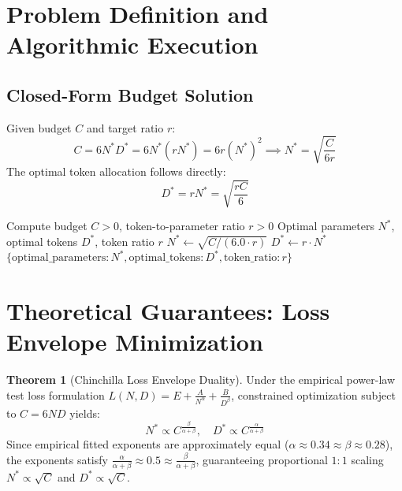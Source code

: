 \documentclass[11pt,a4paper]{article}
\theoremstyle{definition}
\newtheorem{theorem}{Theorem}[section]
\begin{document}
\section{Problem Definition and Algorithmic Execution}

\subsection{Closed-Form Budget Solution}
Given budget $C$ and target ratio $r$:
\begin{equation}
C = 6 N^* D^* = 6 N^* (r N^*) = 6 r (N^*)^2 \implies N^* = \sqrt{\frac{C}{6 r}}
\end{equation}
The optimal token allocation follows directly:
\begin{equation}
D^* = r N^* = \sqrt{\frac{r C}{6}}
\end{equation}

\begin{algorithm}[H]
\caption{Compute-Optimal Parameter and Token Allocation}
\label{alg:scaling_laws}
\begin{algorithmic}[1]
\Require Compute budget $C > 0$, token-to-parameter ratio $r > 0$
\Ensure Optimal parameters $N^*$, optimal tokens $D^*$, token ratio $r$
\State $N^* \gets \sqrt{C / (6.0 \cdot r)}$
\State $D^* \gets r \cdot N^*$
\State \Return $\{\text{optimal\_parameters}: N^*, \text{optimal\_tokens}: D^*, \text{token\_ratio}: r\}$
\end{algorithmic}
\end{algorithm}

\section{Theoretical Guarantees: Loss Envelope Minimization}

\begin{theorem}[Chinchilla Loss Envelope Duality]
Under the empirical power-law test loss formulation $L(N, D) = E + \frac{A}{N^\alpha} + \frac{B}{D^\beta}$, constrained optimization subject to $C = 6 N D$ yields:
\begin{equation}
N^* \propto C^{\frac{\beta}{\alpha + \beta}}, \quad D^* \propto C^{\frac{\alpha}{\alpha + \beta}}
\end{equation}
Since empirical fitted exponents are approximately equal ($\alpha \approx 0.34 \approx \beta \approx 0.28$), the exponents satisfy $\frac{\alpha}{\alpha + \beta} \approx 0.5 \approx \frac{\beta}{\alpha + \beta}$, guaranteeing proportional $1:1$ scaling $N^* \propto \sqrt{C}$ and $D^* \propto \sqrt{C}$.
\end{theorem}
\end{document}
